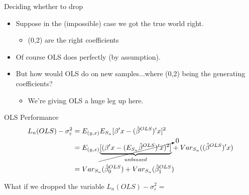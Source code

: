 \documentclass{beamer}
\begin{document}
\begin{frame}{Deciding whether to drop}
	\begin{itemize}
		\item Suppose in the (impossible) case we got the true world right.
		\begin{itemize}
			\item (0,2) are the right coefficients
		\end{itemize}
		\item Of course OLS does perfectly (by assumption).
		\item But how would OLS do on new samples...where (0,2) being the generating coefficients?
		\begin{itemize}
			\item We’re giving OLS a huge leg up here.
		\end{itemize}
	\end{itemize}
\end{frame}

\begin{frame}{OLS Performance}
	\begin{align*}
	L_n(OLS)-\sigma_\varepsilon^2&=E_{(y,x)}E_{S_n}[\beta'x-(\hat{\beta}^{OLS})'x]^2\\
	&=E_{(y,x)}\cancelto{0}{\underbrace{[(\beta'x-(E_{S_n}\hat{\beta}^{OLS})'x)^2]}_{unbiased}}+Var_{S_n}((\hat{\beta}^{OLS})'x)\\
	&=Var_{S_n}(\hat{\beta}_0^{OLS})+Var_{S_n}(\hat{\beta}_1^{OLS})
	\end{align*}
\end{frame}

\begin{frame}[t]{What if we dropped the variable}
	\flushleft$L_n(OLS)-\sigma_\varepsilon^2=$
\end{frame}
\end{document}
